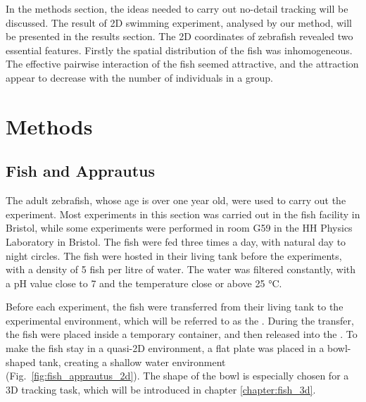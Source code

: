\documentclass[11pt,twoside]{report}
\begin{document}
In the methods section, the ideas needed to carry out no-detail tracking will be discussed. The result of 2D swimming experiment, analysed by our method, will be presented in the results section. The 2D coordinates of zebrafish revealed two essential features. Firstly the spatial distribution of the fish was inhomogeneous. The effective pairwise interaction of the fish seemed attractive, and the attraction appear to decrease with the number of individuals in a group.

\section{Methods}


\subsection{Fish and Apprautus}
\label{section:apprautus_2d}

The adult zebrafish, whose age is over one year old, were used to carry out the experiment. Most experiments in this section was carried out in the fish facility in Bristol, while some experiments were performed in room G59 in the HH Physics Laboratory in Bristol. The fish were fed three times a day, with natural day to night circles. The fish were hosted in their living tank before the experiments, with a density of 5 fish per litre of water. The water was filtered constantly, with a pH value close to 7 and the temperature close or above 25 °C.

Before each experiment, the fish were transferred from their living tank to the experimental environment, which will be referred to as the {\ot}. During the transfer, the fish were placed inside a temporary container, and then released into the {\ot}.
To make the fish stay in a quasi-2D environment, a flat plate was placed in a bowl-shaped tank, creating a shallow water environment (Fig.~\ref{fig:fish_apprautus_2d}). The shape of the bowl is especially chosen for a 3D tracking task, which will be introduced in chapter \ref{chapter:fish_3d}.
\end{document}
